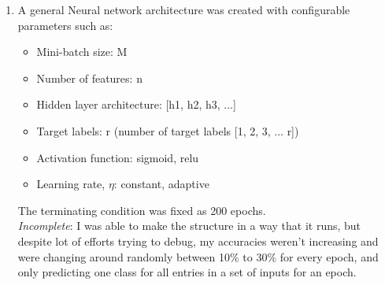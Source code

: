 \begin{enumerate}[label=(\alph*)]
    \item A general Neural network architecture was created with configurable parameters such as:
          \begin{itemize}
              \item Mini-batch size: M
              \item Number of features: n
              \item Hidden layer architecture: [h1, h2, h3, ...]
              \item Target labels: r (number of target labels [1, 2, 3, ... r])
              \item Activation function: sigmoid, relu
              \item Learning rate, $\eta$: constant, adaptive
          \end{itemize}
          The terminating condition was fixed as 200 epochs. \\
          \emph{Incomplete}: I was able to make the structure in a way that it runs,
          but despite lot of efforts trying to debug,
          my accuracies weren't increasing and were changing around randomly between 10\% to 30\% for every epoch,
          and only predicting one class for all entries in a set of inputs for an epoch.


\end{enumerate}
